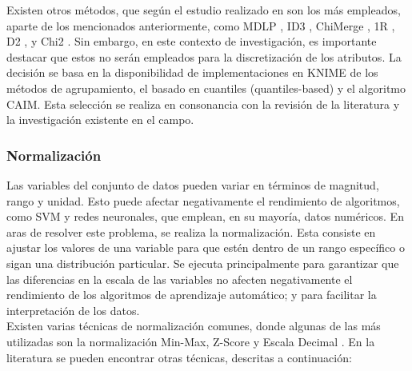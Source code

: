 Existen otros métodos, que según el estudio realizado en \citep{garcia2012survey} son los más empleados, aparte de los mencionados anteriormente, como MDLP \citep{FI1993}, ID3 \citep{quinlan1993c}, ChiMerge \citep{K1992}, 1R \citep{holte1993very}, D2 \citep{catlett1991changing}, y Chi2 \citep{liu1997feature}. Sin embargo, en este contexto de investigación, es importante destacar que estos no serán empleados para la discretización de los atributos. La decisión se basa en la disponibilidad de implementaciones en KNIME de los métodos de agrupamiento, el basado en cuantiles (quantiles-based) y el algoritmo CAIM. Esta selección se realiza en consonancia con la revisión de la literatura y la investigación existente en el campo.

\subsubsection*{Normalización}
Las variables del conjunto de datos pueden variar en términos de magnitud, rango y unidad. Esto puede afectar negativamente el rendimiento de algoritmos, como SVM y redes neuronales, que emplean, en su mayoría, datos numéricos. En aras de resolver este problema, se realiza la normalización. Esta consiste  en ajustar los valores de una variable para que estén dentro de un rango específico o sigan una distribución particular. Se ejecuta principalmente para garantizar que las diferencias en la escala de las variables no afecten negativamente el rendimiento de los algoritmos de aprendizaje automático; y para facilitar la interpretación de los datos.\\
Existen varias técnicas de normalización comunes, donde algunas de las más utilizadas son la normalización Min-Max, Z-Score y Escala Decimal \citep{garcia2012survey}. En la literatura se pueden encontrar otras técnicas, descritas a continuación:
